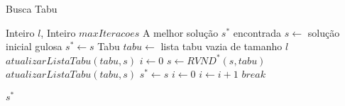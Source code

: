	\begin{algorithm}[H]
    \caption{Busca Tabu}
    \begin{algorithmic}[1]
    \REQUIRE Inteiro $l$, Inteiro $maxIteracoes$
    \ENSURE A melhor solução $s^*$ encontrada
    \STATE $s \leftarrow$ solução inicial gulosa
    \STATE $s^* \leftarrow s$
    \STATE Tabu $tabu \leftarrow$ lista tabu vazia de tamanho $l$
    \STATE $atualizarListaTabu(tabu, s)$
    \STATE $i \leftarrow 0$
    \WHILE{\TRUE}
    	\STATE $s \leftarrow RVND^*(s, tabu)$
    	\STATE $atualizarListaTabu(tabu, s)$
			\STATE $s^* \leftarrow s$
		    \STATE $i \leftarrow 0$
		\ELSE
			\STATE $i \leftarrow i + 1$
				\STATE $break$
			\ENDIF		
		\ENDIF
    \ENDWHILE
    
    \RETURN $s^*$
    \end{algorithmic}
    \end{algorithm}
